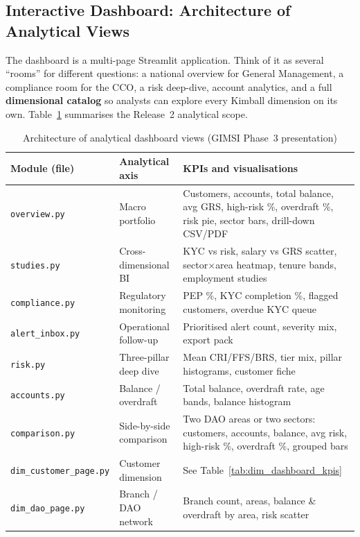 \subsection{Interactive Dashboard: Architecture of Analytical Views}
The dashboard is a multi-page Streamlit application. Think of it as several
``rooms'' for different questions: a national overview for General Management, a
compliance room for the CCO, a risk deep-dive, account analytics, and a full
\textbf{dimensional catalog} so analysts can explore every Kimball dimension on
its own. Table~\ref{tab:vues-analytiques} summarises the Release~2 analytical
scope.

\begin{table}[H]
\centering
\caption{Architecture of analytical dashboard views (GIMSI Phase~3 presentation)}
\label{tab:vues-analytiques}
\renewcommand{\arraystretch}{1.2}
\scriptsize
\begin{tabular}{|p{3.2cm}|p{3.2cm}|p{7.4cm}|}
\hline
\rowcolor{blue!15}
\textbf{Module (file)} & \textbf{Analytical axis} & \textbf{KPIs and visualisations} \\
\hline
\texttt{overview.py} & Macro portfolio & Customers, accounts, total balance, avg GRS, high-risk \%, overdraft \%, risk pie, sector bars, drill-down CSV/PDF \\
\hline
\texttt{studies.py} & Cross-dimensional BI & KYC vs risk, salary vs GRS scatter, sector$\times$area heatmap, tenure bands, employment studies \\
\hline
\texttt{compliance.py} & Regulatory monitoring & PEP \%, KYC completion \%, flagged customers, overdue KYC queue \\
\hline
\texttt{alert\_inbox.py} & Operational follow-up & Prioritised alert count, severity mix, export pack \\
\hline
\texttt{risk.py} & Three-pillar deep dive & Mean CRI/FFS/BRS, tier mix, pillar histograms, customer fiche \\
\hline
\texttt{accounts.py} & Balance / overdraft & Total balance, overdraft rate, age bands, balance histogram \\
\hline
\texttt{comparison.py} & Side-by-side comparison & Two DAO areas or two sectors: customers, accounts, balance, avg risk, high-risk \%, overdraft \%, grouped bars \\
\hline
\texttt{dim\_customer\_page.py} & Customer dimension & See Table~\ref{tab:dim_dashboard_kpis} \\
\hline
\texttt{dim\_dao\_page.py} & Branch / DAO network & Branch count, areas, balance \& overdraft by area, risk scatter \\

\end{tabular}
\end{table}

